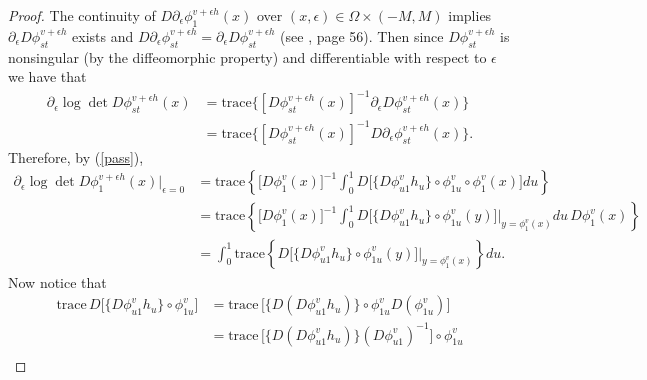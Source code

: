 \documentclass[noinfoline]{imsart}
\begin{document}
\begin{proof}
The continuity of $D {\partial_\epsilon}  \phi^{ v+\epsilon h}_{1}(x)$ over $(x,\epsilon)\in \Omega\times (-M,M)$ implies  $ \partial_\epsilon D \phi^{ v+\epsilon h}_{st}$ exists and   $D {\partial_\epsilon}  \phi^{ v+\epsilon h}_{st}  =  {\partial_\epsilon} D \phi^{ v+\epsilon h}_{st}$ (see \cite{cou:36}, page 56). Then since $D\phi_{st}^{v+\epsilon h}$ is nonsingular (by the diffeomorphic property) and differentiable  with respect to $\epsilon$ we have that
\begin{align*}
\partial_\epsilon  \log \det D\phi_{st}^{v+\epsilon h }(x)&= \text{trace}\bigl\{ [D\phi_{st}^{v+\epsilon h}(x)]^{-1}   \partial_\epsilon D\phi_{st}^{v+\epsilon h}(x) \bigr\} \\
 &= \text{trace}\bigl\{ [D\phi_{st}^{v+\epsilon h}(x)]^{-1}  D \partial_\epsilon \phi_{st}^{v+\epsilon h}(x)  \bigr\} .
\end{align*}
Therefore, by (\ref{pass}),
\begin{align*}
\partial_\epsilon  \log \det D\phi_{1}^{v+\epsilon h }(x)\bigr|_{\epsilon = 0} %
& =\text{trace}\left\{  \bigl[ D\phi_1^v(x) \bigr]^{-1} \int_0^1 D\bigl[ \{D\phi_{u1}^v h_u  \}\circ \phi_{1u}^v\circ \phi^v_1(x)  \bigr]  du  \right\} \\
& =\text{trace}\left\{  \bigl[ D\phi_1^v(x) \bigr]^{-1} \int_0^1 D\bigl[ \{D\phi_{u1}^v h_u  \}\circ \phi_{1u}^v(y)\bigr]\Bigr|_{y=\phi^v_1(x)}     du\, D\phi^v_1(x)  \right\} \\
& = \int_0^1\text{trace}\left\{  D\bigl[ \{D\phi_{u1}^v h_u  \}\circ \phi_{1u}^v(y)\bigr]\Bigr|_{y=\phi^v_1(x)}   \right\}    du .
\end{align*}
Now notice that
\begin{align*}
\text{trace}\, D \bigl[ \{  D\phi_{u1}^v h_u\}\circ \phi^v_{1u}\bigr]
&= \text{trace}\, \bigl[ \{  D (D\phi_{u1}^v h_u)\}\circ \phi^v_{1u} D(\phi^v_{1u})\bigr] \\
&= \text{trace}\, \bigl[    \{D  (D\phi_{u1}^v  h_u) \} (D\phi_{u1}^v )^{-1}\bigr]\circ \phi^v_{1u} \\

\end{align*}
\end{proof}
\end{document}

